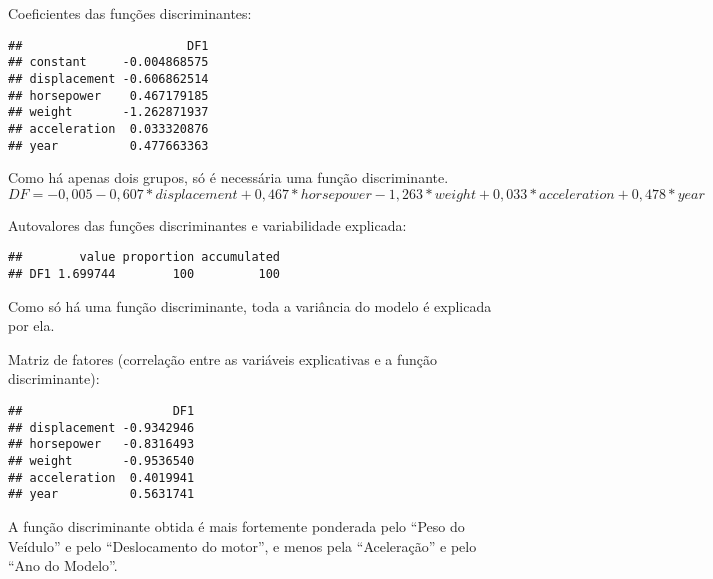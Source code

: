 \documentclass[]{article}
\newenvironment{Shaded}{\begin{snugshade}}{\end{snugshade}}
\newcommand{\OperatorTok}[1]{\textcolor[rgb]{0.81,0.36,0.00}{\textbf{#1}}}
\newcommand{\NormalTok}[1]{#1}
\begin{document}
Coeficientes das funções discriminantes:

\begin{Shaded}
\end{Shaded}

\begin{verbatim}
##                       DF1
## constant     -0.004868575
## displacement -0.606862514
## horsepower    0.467179185
## weight       -1.262871937
## acceleration  0.033320876
## year          0.477663363
\end{verbatim}

Como há apenas dois grupos, só é necessária uma função discriminante.
\(DF= -0,005 -0,607*displacement +0,467*horsepower -1,263*weight +0,033*acceleration +0,478*year\)

Autovalores das funções discriminantes e variabilidade explicada:

\begin{Shaded}
\end{Shaded}

\begin{verbatim}
##        value proportion accumulated
## DF1 1.699744        100         100
\end{verbatim}

Como só há uma função discriminante, toda a variância do modelo é
explicada por ela.

Matriz de fatores (correlação entre as variáveis explicativas e a função
discriminante):

\begin{Shaded}
\end{Shaded}

\begin{verbatim}
##                     DF1
## displacement -0.9342946
## horsepower   -0.8316493
## weight       -0.9536540
## acceleration  0.4019941
## year          0.5631741
\end{verbatim}

A função discriminante obtida é mais fortemente ponderada pelo ``Peso do
Veídulo'' e pelo ``Deslocamento do motor'', e menos pela ``Aceleração''
e pelo ``Ano do Modelo''.
\end{document}
